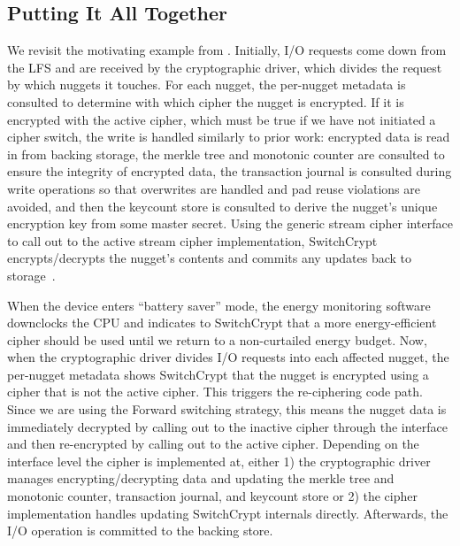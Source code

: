 \subsection{Putting It All Together} \label{subsec:summary}

We revisit the motivating example from . Initially, I/O
requests come down from the LFS and are received by the cryptographic driver,
which divides the request by which nuggets it touches. For each nugget, the
per-nugget metadata is consulted to determine with which cipher the nugget is
encrypted. If it is encrypted with the active cipher, which must be true if we
have not initiated a cipher switch, the write is handled similarly to prior
work: encrypted data is read in from backing storage, the merkle tree and
monotonic counter are consulted to ensure the integrity of encrypted data, the
transaction journal is consulted during write operations so that overwrites are
handled and pad reuse violations are avoided, and then the keycount store is
consulted to derive the nugget's unique encryption key from some master secret.
Using the generic stream cipher interface to call out to the active stream
cipher implementation, SwitchCrypt encrypts/decrypts the nugget's contents and
commits any updates back to storage~\cite{StrongBox}.

When the device enters ``battery saver'' mode, the energy monitoring software
downclocks the CPU and indicates to SwitchCrypt that a more energy-efficient
cipher should be used until we return to a non-curtailed energy budget. Now,
when the cryptographic driver divides I/O requests into each affected nugget,
the per-nugget metadata shows SwitchCrypt that the nugget is encrypted using a
cipher that is not the active cipher. This triggers the re-ciphering code path.
Since we are using the Forward switching strategy, this means the nugget data is
immediately decrypted by calling out to the inactive cipher through the
interface and then re-encrypted by calling out to the active cipher. Depending
on the interface level the cipher is implemented at, either 1) the cryptographic
driver manages encrypting/decrypting data and updating the merkle tree and
monotonic counter, transaction journal, and keycount store or 2) the cipher
implementation handles updating SwitchCrypt internals directly. Afterwards, the
I/O operation is committed to the backing store.
